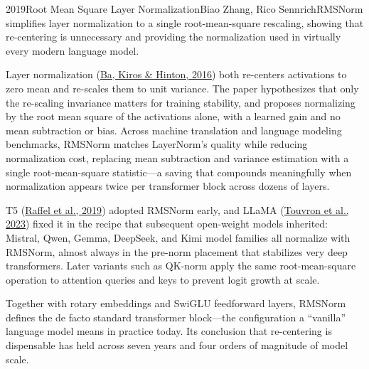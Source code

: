 
\begin{papersummary}{2019}{Root Mean Square Layer Normalization}{Biao Zhang, Rico Sennrich}{RMSNorm simplifies layer normalization to a single root-mean-square rescaling, showing that re-centering is unnecessary and providing the normalization used in virtually every modern language model.}

Layer normalization (\hyperref[paper:ba-2016]{Ba, Kiros \& Hinton, 2016}) both re-centers activations to zero mean and re-scales them to unit variance. The paper hypothesizes that only the re-scaling invariance matters for training stability, and proposes normalizing by the root mean square of the activations alone, with a learned gain and no mean subtraction or bias. Across machine translation and language modeling benchmarks, RMSNorm matches LayerNorm's quality while reducing normalization cost, replacing mean subtraction and variance estimation with a single root-mean-square statistic---a saving that compounds meaningfully when normalization appears twice per transformer block across dozens of layers.

T5 (\hyperref[paper:raffel-2019]{Raffel et al., 2019}) adopted RMSNorm early, and LLaMA (\hyperref[paper:touvron-2023-llama]{Touvron et al., 2023}) fixed it in the recipe that subsequent open-weight models inherited: Mistral, Qwen, Gemma, DeepSeek, and Kimi model families all normalize with RMSNorm, almost always in the pre-norm placement that stabilizes very deep transformers. Later variants such as QK-norm apply the same root-mean-square operation to attention queries and keys to prevent logit growth at scale.

Together with rotary embeddings and SwiGLU feedforward layers, RMSNorm defines the de facto standard transformer block---the configuration a ``vanilla'' language model means in practice today. Its conclusion that re-centering is dispensable has held across seven years and four orders of magnitude of model scale.

\end{papersummary}
